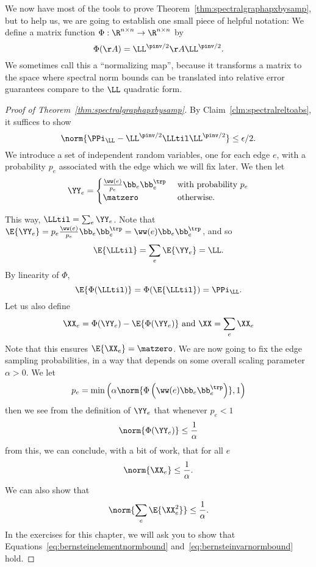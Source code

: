 We now have most of the tools to prove
Theorem~\ref{thm:spectralgraphapxbysamp}, but to help us, we are going
to establish one small piece of helpful notation:
We define a matrix function $\Phi : \R^{n\times n} \to
\R^{n\times n} $
by
\[
  \Phi(\AA) = \LL^{\pinv/2}\AA\LL^{\pinv/2}.
  \]
We sometimes call this a ``normalizing map'', because it transforms a matrix to
the space where spectral norm bounds can be translated into relative
error guarantees compare to the $\LL$ quadratic form.
\begin{proof}[Proof of Theorem~\ref{thm:spectralgraphapxbysamp}]
  By Claim~\ref{clm:spectralreltoabs}, it suffices to show
  \begin{equation}
    \label{eq:spectralnormerrbound}
  \norm{\PPi_{\LL} - \LL^{\pinv/2}\LLtil\LL^{\pinv/2}} \leq
  \epsilon/2.
\end{equation}
  We introduce a set of independent random variables, one for each
  edge $e$, with a probability $p_e$ associated with the edge which we
  will fix later.
 We then let
  \[
    \YY_e =
    \begin{cases}
      \frac{\ww(e)}{p_e} \bb_e \bb_e^{\trp}
      & \text{ with probability } p_e
      \\
      \matzero
      & \text{ otherwise. }
    \end{cases}
  \]

This way, $\LLtil = \sum_e \YY_e$.
Note that $\E{\YY_e} = p_e \frac{\ww(e)}{p_e} \bb_e \bb_e^{\trp} =
\ww(e) \bb_e \bb_e^{\trp}$, and so
\[
  \E{\LLtil} =\sum_e \E{\YY_e} = \LL
  .
\]
By linearity of $\Phi$,
\[
\E{\Phi(\LLtil)} =  \Phi(\E{\LLtil}) = \PPi_{\LL}.
\]
Let us also define
\[
  \XX_e = \Phi(\YY_e) - \E {\Phi(\YY_e)} \text{ and } \XX = \sum_e \XX_e
\]
Note that this ensures $\E {\XX_e} = \matzero$.
We are now going to fix the edge sampling probabilities, in a way that
depends on some overall scaling parameter $\alpha > 0$.
We let
\[
  p_e = \min\left( \alpha \norm{\Phi\left(\ww(e)
      \bb_e\bb_e^{\trp} \right)}, 1 \right)
\]
then we see from the definition of $\YY_e$ that whenever $p_e < 1$
\[
  \norm{\Phi(\YY_e) } \leq \frac{1}{\alpha}
\]
from this, we can conclude, with a bit of work, that for all $e$
\begin{equation}
  \label{eq:bernsteinelementnormbound}
  \norm{\XX_e} \leq \frac{1}{\alpha}.
\end{equation}
We can also show that
\begin{equation}
  \label{eq:bernsteinvarnormbound}
  \norm{\sum_e \E{\XX_e^2}} \leq \frac{1}{\alpha}
  .
\end{equation}
In the exercises for this chapter, we will ask you to show that
Equations~\eqref{eq:bernsteinelementnormbound} and~\eqref{eq:bernsteinvarnormbound} hold.


\end{proof}
